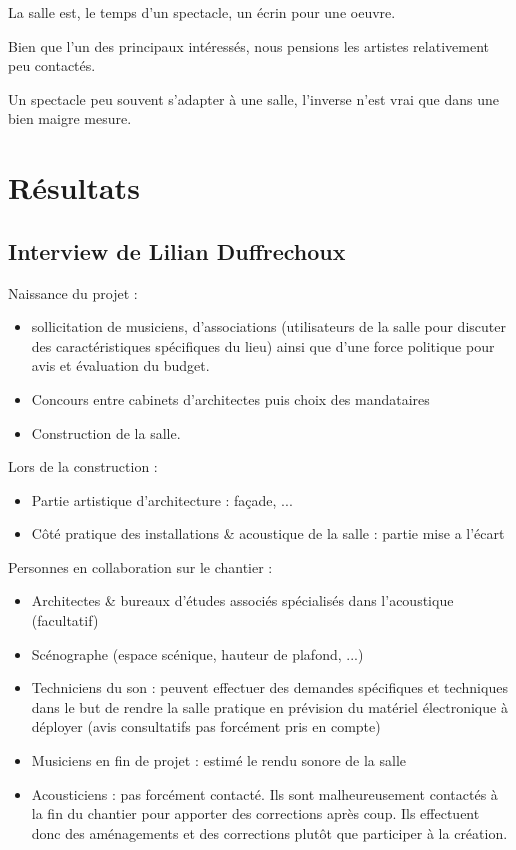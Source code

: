 \documentclass[a4paper, 11pt]{report}
\begin{document}
La salle est, le temps d'un spectacle, un écrin pour une oeuvre.

Bien que l'un des principaux intéressés, nous pensions les artistes relativement peu contactés.

Un spectacle peu souvent s'adapter à une salle, l'inverse n'est vrai que dans une bien maigre mesure.


\section{Résultats}

\subsection{Interview de Lilian {\sc Duffrechoux}}

Naissance du projet :

\begin{itemize}
\item sollicitation de musiciens, d'associations (utilisateurs de la salle pour discuter des caractéristiques spécifiques du lieu) ainsi que d'une force politique pour avis et évaluation du budget.
\item Concours entre cabinets d'architectes puis choix des mandataires
\item Construction de la salle.
\end{itemize}

Lors de la construction :

\begin{itemize}
\item Partie artistique d'architecture : façade, ...
\item Côté pratique des installations \& acoustique de la salle : partie mise a l'écart
\end{itemize}

Personnes en collaboration sur le chantier :

\begin{itemize}
\item Architectes \& bureaux d'études associés spécialisés dans l'acoustique (facultatif)
\item Scénographe (espace scénique, hauteur de plafond, ...)
\item Techniciens du son :  peuvent effectuer des demandes spécifiques et techniques dans le but de rendre la salle pratique en prévision du matériel électronique à déployer (avis consultatifs pas forcément pris en compte)
\item Musiciens en fin de projet : estimé le rendu sonore de la salle
\item Acousticiens : pas forcément contacté. Ils sont malheureusement contactés à la fin du chantier pour apporter des corrections après coup.  Ils effectuent donc des aménagements et des corrections plutôt que participer à la création.
\end{itemize}
\end{document}
